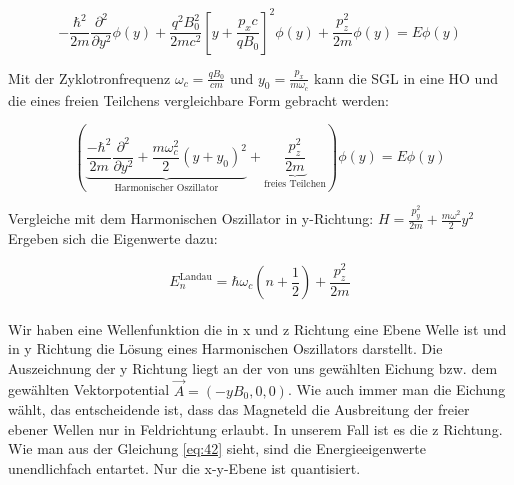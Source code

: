 \[ -\frac{ \hbar^2}{2m} \frac{\partial^2}{\partial y^2}\phi(y) + \frac{q^2 B_0^2}{2mc^2} \left[y +  \frac{p_xc}{qB_0} \right]^2\phi(y) +\frac{p_z^2}{2m}\phi(y)  = E \phi(y) \]


Mit der Zyklotronfrequenz \( \omega_c = \frac{qB_0}{cm} \) und \(y_0 = \frac{p_x}{m\omega_c}\) kann die SGL in eine HO und die eines freien Teilchens vergleichbare Form gebracht werden:

\[  \left( \underbrace{ \frac{- \hbar^2}{2m} \frac{\partial^2}{\partial y^2} + \frac{m\omega_c^2}{2} (y +  y_0 )^2}_{\text{Harmonischer Oszillator}} +\underbrace{ \frac{p_z^2}{2m}}_{\text{freies Teilchen}}  \right)\phi(y) = E \phi(y) \]


Vergleiche mit dem Harmonischen Oszillator in y-Richtung: \( H = \frac{p^2_y}{2m} + \frac{m\omega^2}{2}y^2 \) Ergeben sich die Eigenwerte dazu:

\begin{equation}
\label{eq:42}
 \boxed{E_n^{\text{Landau}} = \hbar\omega_c(n+\frac{1}{2}) + \frac{p_z^2}{2m} }
\end{equation}
\\
Wir haben eine Wellenfunktion die in x und z Richtung eine Ebene Welle ist und in y Richtung die Lösung eines Harmonischen Oszillators darstellt. Die Auszeichnung der y Richtung liegt an der von uns gewählten Eichung bzw. dem gewählten Vektorpotential  \(\vec A = (-yB_0,0,0)\). Wie auch immer man die Eichung wählt, das entscheidende ist, dass das Magneteld die Ausbreitung der freier ebener Wellen nur in Feldrichtung erlaubt. In unserem Fall ist es die z Richtung. Wie man aus der Gleichung \eqref{eq:42} sieht, sind die Energieeigenwerte unendlichfach entartet. Nur die x-y-Ebene ist quantisiert.





